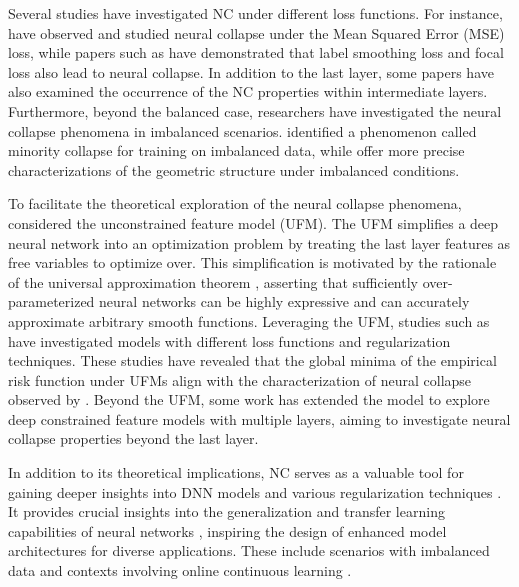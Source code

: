 \documentclass{article}
\theoremstyle{plain}
\theoremstyle{definition}
\theoremstyle{remark}
\begin{document}
Several studies have investigated NC under different loss functions. For instance, \citep{han2021neural, poggio2020explicit, zhou2022optimization}  have observed and studied neural collapse under the Mean Squared Error (MSE) loss, while papers such as \citep{zhou2022all, guo2024cross} have demonstrated that label smoothing loss and focal loss also lead to neural collapse. In addition to the last layer, some papers \citep{he2023law, rangamani2023feature} have also examined the occurrence of the NC properties within intermediate layers.
Furthermore, beyond the balanced case, researchers have investigated the neural collapse phenomena in imbalanced scenarios. \citep{fang2021exploring} identified a phenomenon called minority collapse for training on imbalanced data, while \citep{hong2023neural,thrampoulidis2022imbalance, dang2023neural} offer more precise characterizations of the geometric structure under imbalanced conditions. 

To facilitate the theoretical exploration of the neural collapse phenomena, \citep{fang2021exploring, mixon2020neural} considered the unconstrained feature model (UFM). The UFM simplifies a deep neural network into an optimization problem by treating the last layer features as free variables to optimize over. 
This simplification is motivated by the rationale of the universal approximation theorem \citep{hornik1989multilayer}, asserting that sufficiently over-parameterized neural networks can be highly expressive and can accurately approximate arbitrary smooth functions. 
Leveraging the UFM, studies such as 
\citep{zhu2021geometric,zhou2022optimization, thrampoulidis2022imbalance, tirer2022extended, tirer2023perturbation, ergen2021revealing, wojtowytsch2020emergence}  have investigated models with different loss functions and regularization techniques. These studies have revealed that the global minima of the empirical risk function under UFMs align with the characterization of neural collapse observed by \citep{papyan2020prevalence}.
Beyond the UFM, some work \citep{tirer2022extended, sukenik2024deep} has extended the model to explore deep constrained feature models with multiple layers, aiming to investigate neural collapse properties beyond the last layer.

In addition to its theoretical implications, NC serves as a valuable tool for gaining deeper insights into DNN models and various regularization techniques \citep{guo2024cross, fisher2024pushing}. It provides crucial insights into the generalization and transfer learning capabilities of neural networks \citep{hui2022limitations, kothapalli2022neural, galanti2021role}, inspiring the design of enhanced model architectures for diverse applications. These include scenarios with imbalanced data \citep{yang2022inducing, kimfixed} and contexts involving online continuous learning \citep{seo2024learning}.
\end{document}
